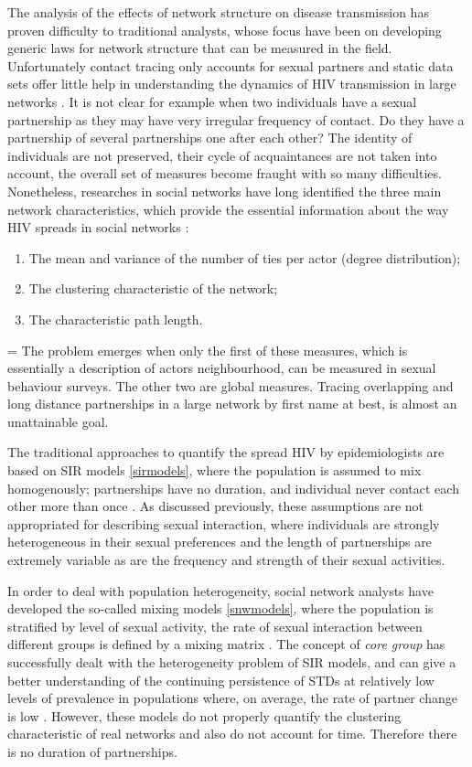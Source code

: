 The analysis of the effects of network structure on disease transmission has proven
difficulty to traditional analysts, whose focus have been on developing generic laws for
network structure that can be measured in the field. Unfortunately contact tracing only
accounts for sexual partners and static data sets offer little help in understanding the
dynamics of HIV transmission in large networks \cite{Watts2003}. It is not clear for
example when two individuals have a sexual partnership as they may have very irregular
frequency of contact. Do they have a partnership of several partnerships one after each
other? The identity of individuals are not preserved, their cycle of acquaintances are
not taken into account, the overall set of measures become fraught with so many
difficulties. Nonetheless, researches in social networks have long identified the three
main network characteristics, which provide the essential information about the way HIV
spreads in social networks \cite{Kretzschmar2000}:
\parskip=0pt
\begin{enumerate}
    \item The mean and variance of the number of ties per actor (degree distribution);
    \item The clustering characteristic of the network;
    \item The characteristic path length.
\end{enumerate}
\parskip=\baselineskip
The problem emerges when only the first of these measures, which is essentially a
description of actors neighbourhood, can be measured in sexual behaviour surveys. The
other two are global measures. Tracing overlapping and long distance partnerships in a
large network by first name at best, is almost an unattainable goal.

The traditional approaches to quantify the spread HIV by epidemiologists are based on SIR
models \ref{sirmodels}, where the population is assumed to mix homogenously; partnerships
have no duration, and individual never contact each other more than once
\cite{Diekmann1995,Kretzschmar2000}. As discussed previously, these assumptions are not
appropriated for describing sexual interaction, where individuals are strongly
heterogeneous in their sexual preferences and the length of partnerships are extremely
variable as are the frequency and strength of their sexual activities.

In order to deal with population heterogeneity, social network analysts have developed
the so-called mixing models \ref{snwmodels}, where the population is stratified by level
of sexual activity, the rate of sexual interaction between different groups is defined by
a mixing matrix \cite{Morris1991,Anderson1999}. The concept of \emph{core group} has
successfully dealt with the heterogeneity problem of SIR models, and can give a better
understanding of the continuing persistence of STDs at relatively low levels of
prevalence in populations where, on average, the rate of partner change is low
\cite{Anderson1991}. However, these models do not properly quantify the clustering
characteristic of real networks and also do not account for time. Therefore there is no
duration of partnerships.

